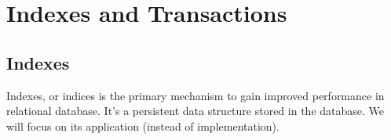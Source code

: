 \ifx\PREAMBLE\undefined


\fi
\chapter{Indexes and Transactions}
\section{Indexes}
Indexes, or indices is the primary mechanism to gain improved performance in relational database. It's a persistent data structure stored in the database. We will focus on its application (instead of implementation).

\ifx\PREAMBLE\undefined

\fi